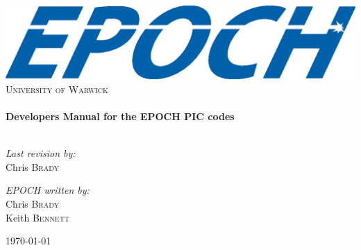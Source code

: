 \begin{titlepage}

\begin{center}

\includegraphics[width=14cm]{./images/EPOCHLogo.eps}\\[1cm]

\textsc{\LARGE University of Warwick}\\[1.5cm]

\HRule \\[0.4cm]
{ \huge \bfseries Developers Manual for the EPOCH PIC codes}\\[0.4cm]

\HRule \\[1.5cm]

\begin{minipage}{0.4\textwidth}
\begin{flushleft} \large
\emph{Last revision by:}\\
Chris \textsc{Brady}
\end{flushleft}
\end{minipage}
\begin{minipage}{0.4\textwidth}
\begin{flushright} \large
\emph{EPOCH written by:} \\
Chris \textsc{Brady}\\
Keith \textsc{Bennett}\\
\end{flushright}
\end{minipage}

\vfill

{\large \today}

\end{center}

\end{titlepage}
